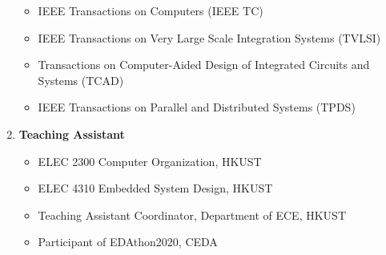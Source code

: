 \documentclass{mycv}
\begin{document}
\begin{enumerate}[label={}]
  \begin{itemize}
  	\item IEEE Transactions on Computers (IEEE TC)
  	\item IEEE Transactions on Very Large Scale Integration Systems (TVLSI)
  	\item Transactions on Computer-Aided Design of Integrated Circuits and Systems (TCAD)
  	\item IEEE Transactions on Parallel and Distributed Systems (TPDS)
  \end{itemize}
  \item \textbf{Teaching Assistant}
  \begin{itemize}
    \item ELEC 2300 Computer Organization, HKUST 
    \item ELEC 4310 Embedded System Design, HKUST 
    \item Teaching Assistant Coordinator, Department of ECE, HKUST 
    \item Participant of EDAthon2020, CEDA 
  \end{itemize}
\end{enumerate}
\end{document}
